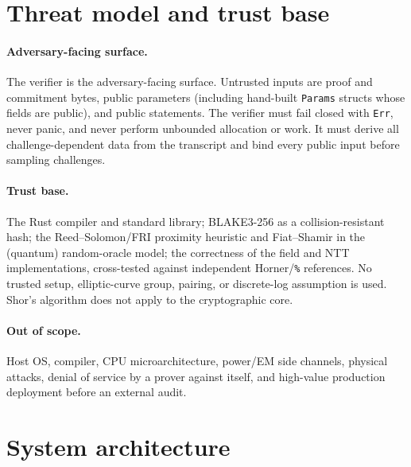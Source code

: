 \documentclass[11pt,a4paper]{article}
\begin{document}
\section{Threat model and trust base}

\paragraph{Adversary-facing surface.} The verifier is the adversary-facing
surface. Untrusted inputs are proof and commitment bytes, public parameters
(including hand-built \texttt{Params} structs whose fields are public), and
public statements. The verifier must fail closed with \texttt{Err}, never
panic, and never perform unbounded allocation or work. It must derive all
challenge-dependent data from the transcript and bind every public input
before sampling challenges.

\paragraph{Trust base.} The Rust compiler and standard library; BLAKE3-256 as
a collision-resistant hash; the Reed--Solomon/FRI proximity heuristic and
Fiat--Shamir in the (quantum) random-oracle model; the correctness of the
field and NTT implementations, cross-tested against independent
Horner/\texttt{\%} references. No trusted setup, elliptic-curve group,
pairing, or discrete-log assumption is used. Shor's algorithm does not apply
to the cryptographic core.

\paragraph{Out of scope.} Host OS, compiler, CPU microarchitecture,
power/EM side channels, physical attacks, denial of service by a prover
against itself, and high-value production deployment before an external
audit.

\section{System architecture}

\begin{center}
\end{center}
\end{document}
